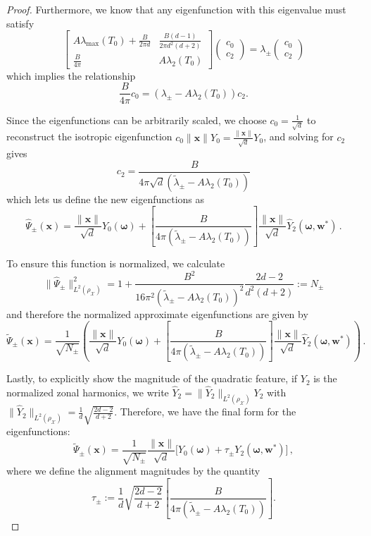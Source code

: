 \begin{proof}
    Furthermore, we know that any eigenfunction with this eigenvalue must satisfy
    \[
         \begin{bmatrix}
            A\lambda_{\max}(T_0) + \frac{B}{2\pi d} & \frac{B(d-1)}{2 \pi d^2(d+2)}\\
            \frac{B}{4 \pi } & A\lambda_2(T_0)
        \end{bmatrix}\begin{pmatrix}
            c_0\\
            c_2
        \end{pmatrix} = \lambda_{\pm}\begin{pmatrix}
            c_0\\
            c_2
        \end{pmatrix}
    \]
    which implies the relationship
    \[
        \frac{B}{4\pi}c_0 = (\lambda_{\pm} - A \lambda_2(T_0))c_2.
    \]
    
    Since the eigenfunctions can be arbitrarily scaled, we choose $c_0 = \frac{1}{\sqrt d}$ to reconstruct the isotropic eigenfunction $c_0 \|\bm x\| Y_0 = \frac{\|\bm x\|}{\sqrt d} Y_0$, and solving for $c_2$ gives
    \[
        c_2 = \frac{B}{4 \pi \sqrt d(\tilde{\lambda}_{\pm}-A\lambda_2(T_0))}
    \]
    which lets us define the new eigenfunctions as
    \[
        \hat{\Psi}_{\pm}(\bm x) = \frac{\|\bm x\|}{\sqrt d} Y_0(\bm \omega)+ \left[ \frac{B}{4 \pi( \tilde{\lambda}_{\pm} - A\lambda_2(T_0) )} \right] \frac{\|\bm x\|}{\sqrt d}\hat{Y}_2(\bm \omega, \bm w^*) \, .
    \]

    To ensure this function is normalized, we calculate
    \[
        \|\hat{\Psi}_{\pm}\|^2_{L^2(\rho_{\mathcal X})} = 1 + \frac{B^2}{16 \pi ^2( \tilde{\lambda}_{\pm}-A\lambda_2(T_0))^2} \frac{2d -2}{d^2(d+2)}:= N_{\pm}
    \]
    and therefore the normalized approximate eigenfunctions are given by
    \[
        \tilde{\Psi}_{\pm}(\bm x) = \frac{1}{\sqrt{N_{\pm}}}\left( \frac{\|\bm x\|}{\sqrt d} Y_0(\bm \omega)+ \left[ \frac{B}{4 \pi ( \tilde{\lambda}_{\pm}-A\lambda_2(T_0) )} \right] \frac{\|\bm x\|}{\sqrt d} \hat{Y}_2(\bm \omega, \bm w^*)\right)\, .
    \]

    Lastly, to explicitly show the magnitude of the quadratic feature, if $Y_2$ is the normalized zonal harmonics, we write $\hat{Y}_2 = \|\hat{Y}_2\|_{L^2(\rho_{\mathcal X})} Y_2$ with $\|\hat{Y}_2\|_{L^2(\rho_{\mathcal X})} = \frac{1}{d}\sqrt{\frac{2d - 2}{d+2}}$. Therefore, we have the final form for the eigenfunctions:
    \[
        \tilde{\Psi}_{\pm}(\bm x) = \frac{1}{\sqrt{N_{\pm}}}\frac{\|\bm x\|}{\sqrt d} \Big[ Y_0(\bm \omega)+  \tau_{\pm} Y_2(\bm \omega, \bm w^*) \Big]\,,
    \]
    where we define the alignment magnitudes by the quantity
    \[
        \tau_{\pm} := \frac{1}{d}\sqrt{\frac{2d - 2}{d+2}}\left[\frac{B}{4 \pi (\tilde{\lambda}_{\pm}-A\lambda_2(T_0))}\right].
    \]


\end{proof}
